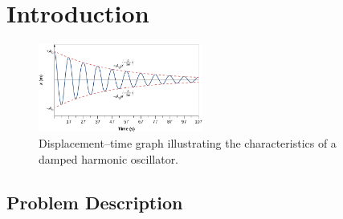 \section{Introduction}

\begin{figure}
    \centering
    \includegraphics[width=0.48\textwidth]{Images/damped_shm.png}
    \caption{Displacement–time graph illustrating the characteristics of a damped harmonic oscillator.}
    \label{fig:NTNU-letters}
\end{figure}

\lipsum[1-2]

\subsection{Problem Description}
\lipsum[2-3]

